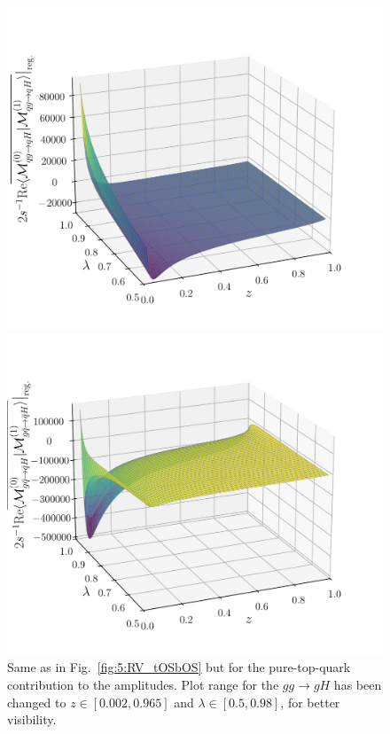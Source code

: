 \begin{figure}[h]
\begin{minipage}[t]{0.49\textwidth}
  \end{minipage}
  \begin{minipage}[t]{0.49\textwidth}
  \centering
  \includegraphics[width=\textwidth]{Images/RV_amplitudes/tOStOS_qg.pdf}
  \end{minipage}
  \begin{minipage}[t]{0.49\textwidth}
  \centering
  \includegraphics[width=\textwidth]{Images/RV_amplitudes/tOStOS_gqB.pdf}
  \end{minipage}
  \caption{Same as in Fig.~\ref{fig:5:RV_tOSbOS} but for the pure-top-quark contribution to the amplitudes. Plot range for the $g g \rightarrow g H$ has been changed to $z \in [0.002, 0.965]$ and $\lambda \in [0.5, 0.98]$, for better visibility.}
  \label{fig:5:RV_tOStOS}
\end{figure}
